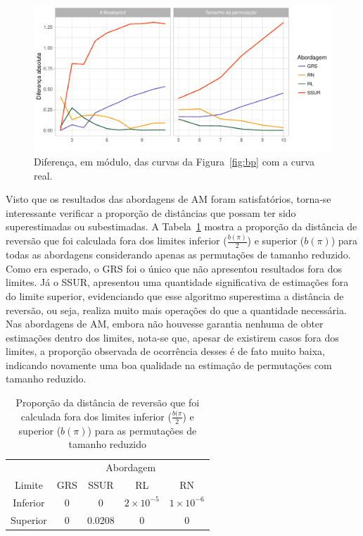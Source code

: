 \documentclass[runningheads,a4paper]{llncs}
\begin{document}
\begin{figure}[H]
	\centering
	\includegraphics[scale=0.5]{dist.pdf}
	\caption{Diferença, em módulo, das curvas da Figura~\ref{fig:bp} com a curva real.}
	\label{fig:dist}
\end{figure}

Visto que os resultados das abordagens de AM foram satisfatórios, torna-se interessante verificar a proporção de distâncias que possam ter sido superestimadas ou subestimadas. A Tabela~\ref{tab:4} mostra a proporção da distância de reversão que foi calculada fora dos limites inferior ($\frac{b(\pi)}{2}$) e superior ($b(\pi)$) para todas as abordagens considerando apenas as permutações de tamanho reduzido. Como era esperado, o GRS foi o único que não apresentou resultados fora dos limites. Já o SSUR, apresentou uma quantidade significativa de estimações fora do limite superior, evidenciando que esse algoritmo superestima a distância de reversão, ou seja, realiza muito mais operações do que a quantidade necessária. Nas abordagens de AM, embora não houvesse garantia nenhuma de obter estimações dentro dos limites, nota-se que, apesar de existirem casos fora dos limites, a proporção observada de ocorrência desses é de fato muito baixa, indicando novamente uma boa qualidade na estimação de permutações com tamanho reduzido.

\begin{table}[H]
	\centering
	\caption{Proporção da distância de reversão que foi calculada fora dos limites inferior ($\frac{b(\pi}{2}$) e superior ($b(\pi)$) para as permutações de tamanho reduzido}
	\label{tab:4}
	\begin{tabular}{ccccc}
		\toprule
		&  \multicolumn{4}{c}{Abordagem}\\
		\cmidrule(lr){2-5}
		Limite & GRS & SSUR & RL & RN \\ 
		\midrule
		Inferior & 0 & 0 & $2\times10^{-5}$ & $1\times10^{-6}$\\ 
		Superior & 0 & 0.0208 & 0 & 0 \\ 
		\bottomrule
	\end{tabular}
\end{table}
\end{document}
